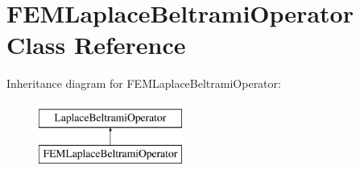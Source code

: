 \hypertarget{class_f_e_m_laplace_beltrami_operator}{}\section{F\+E\+M\+Laplace\+Beltrami\+Operator Class Reference}
\label{class_f_e_m_laplace_beltrami_operator}
Inheritance diagram for F\+E\+M\+Laplace\+Beltrami\+Operator\+:\begin{figure}[H]
\begin{center}
\leavevmode
\includegraphics[height=2.000000cm]{class_f_e_m_laplace_beltrami_operator}
\end{center}
\end{figure}
